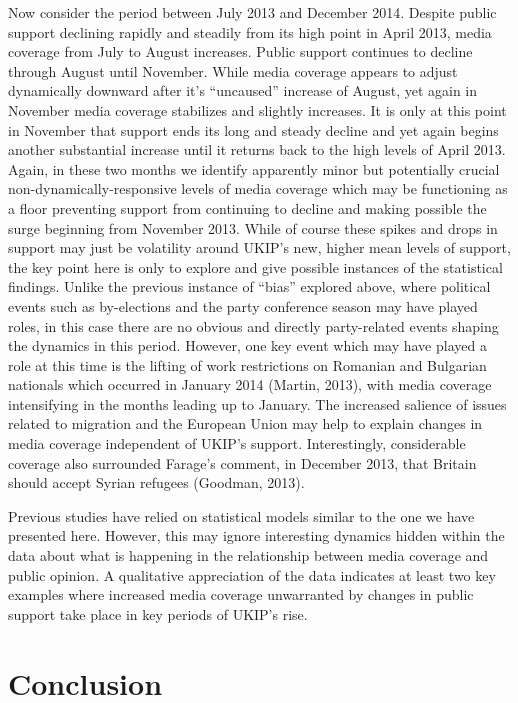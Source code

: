 \documentclass[12pt,article]{article}
\begin{document}
Now consider the period between July 2013 and December 2014. Despite
public support declining rapidly and steadily from its high point in
April 2013, media coverage from July to August increases. Public support
continues to decline through August until November. While media coverage
appears to adjust dynamically downward after it's ``uncaused'' increase
of August, yet again in November media coverage stabilizes and slightly
increases. It is only at this point in November that support ends its
long and steady decline and yet again begins another substantial
increase until it returns back to the high levels of April 2013. Again,
in these two months we identify apparently minor but potentially crucial
non-dynamically-responsive levels of media coverage which may be
functioning as a floor preventing support from continuing to decline and
making possible the surge beginning from November 2013. While of course
these spikes and drops in support may just be volatility around UKIP's
new, higher mean levels of support, the key point here is only to
explore and give possible instances of the statistical findings. Unlike
the previous instance of ``bias'' explored above, where political events
such as by-elections and the party conference season may have played
roles, in this case there are no obvious and directly party-related
events shaping the dynamics in this period. However, one key event which
may have played a role at this time is the lifting of work restrictions
on Romanian and Bulgarian nationals which occurred in January 2014
(Martin, 2013), with media coverage intensifying in the months leading
up to January. The increased salience of issues related to migration and
the European Union may help to explain changes in media coverage
independent of UKIP's support. Interestingly, considerable coverage also
surrounded Farage's comment, in December 2013, that Britain should
accept Syrian refugees (Goodman, 2013).

Previous studies have relied on statistical models similar to the one we
have presented here. However, this may ignore interesting dynamics
hidden within the data about what is happening in the relationship
between media coverage and public opinion. A qualitative appreciation of
the data indicates at least two key examples where increased media
coverage unwarranted by changes in public support take place in key
periods of UKIP's rise.

\section{Conclusion}\label{conclusion}
\end{document}

